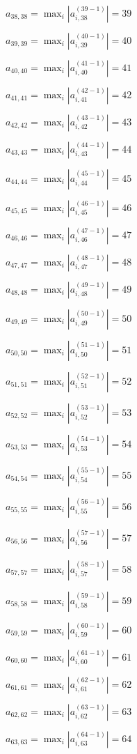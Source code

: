 \documentclass[a4paper,12pt]{article}
\begin{document}
$a _{ 38, 38 } =  \max _i |a _{ i, 38 } ^{ (39 - 1) } | = 39$

$a _{ 39, 39 } =  \max _i |a _{ i, 39 } ^{ (40 - 1) } | = 40$

$a _{ 40, 40 } =  \max _i |a _{ i, 40 } ^{ (41 - 1) } | = 41$

$a _{ 41, 41 } =  \max _i |a _{ i, 41 } ^{ (42 - 1) } | = 42$

$a _{ 42, 42 } =  \max _i |a _{ i, 42 } ^{ (43 - 1) } | = 43$

$a _{ 43, 43 } =  \max _i |a _{ i, 43 } ^{ (44 - 1) } | = 44$

$a _{ 44, 44 } =  \max _i |a _{ i, 44 } ^{ (45 - 1) } | = 45$

$a _{ 45, 45 } =  \max _i |a _{ i, 45 } ^{ (46 - 1) } | = 46$

$a _{ 46, 46 } =  \max _i |a _{ i, 46 } ^{ (47 - 1) } | = 47$

$a _{ 47, 47 } =  \max _i |a _{ i, 47 } ^{ (48 - 1) } | = 48$

$a _{ 48, 48 } =  \max _i |a _{ i, 48 } ^{ (49 - 1) } | = 49$

$a _{ 49, 49 } =  \max _i |a _{ i, 49 } ^{ (50 - 1) } | = 50$

$a _{ 50, 50 } =  \max _i |a _{ i, 50 } ^{ (51 - 1) } | = 51$

$a _{ 51, 51 } =  \max _i |a _{ i, 51 } ^{ (52 - 1) } | = 52$

$a _{ 52, 52 } =  \max _i |a _{ i, 52 } ^{ (53 - 1) } | = 53$

$a _{ 53, 53 } =  \max _i |a _{ i, 53 } ^{ (54 - 1) } | = 54$

$a _{ 54, 54 } =  \max _i |a _{ i, 54 } ^{ (55 - 1) } | = 55$

$a _{ 55, 55 } =  \max _i |a _{ i, 55 } ^{ (56 - 1) } | = 56$

$a _{ 56, 56 } =  \max _i |a _{ i, 56 } ^{ (57 - 1) } | = 57$

$a _{ 57, 57 } =  \max _i |a _{ i, 57 } ^{ (58 - 1) } | = 58$

$a _{ 58, 58 } =  \max _i |a _{ i, 58 } ^{ (59 - 1) } | = 59$

$a _{ 59, 59 } =  \max _i |a _{ i, 59 } ^{ (60 - 1) } | = 60$

$a _{ 60, 60 } =  \max _i |a _{ i, 60 } ^{ (61 - 1) } | = 61$

$a _{ 61, 61 } =  \max _i |a _{ i, 61 } ^{ (62 - 1) } | = 62$

$a _{ 62, 62 } =  \max _i |a _{ i, 62 } ^{ (63 - 1) } | = 63$

$a _{ 63, 63 } =  \max _i |a _{ i, 63 } ^{ (64 - 1) } | = 64$
\end{document}
